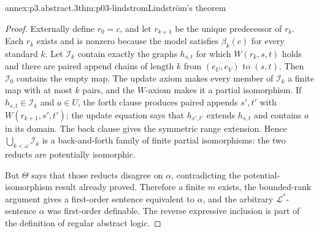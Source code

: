 \begin{annexitem}{annex:p3.abstract.3}{thm:p03-lindstrom}{Lindstr\"om's theorem}
\begin{proof}
Externally define \(r_0=c\), and let \(r_{k+1}\) be the unique predecessor of
\(r_k\).  Each \(r_k\) exists and is nonzero because the model satisfies
\(\beta_k(c)\) for every standard \(k\).  Let
\(\mathcal I_k\) contain exactly the graphs \(h_{s,t}\) for which
\(W(r_k,s,t)\) holds and there are paired append chains of length \(k\) from
\((e_U,e_V)\) to \((s,t)\).  Then \(\mathcal I_0\) contains the empty map.
The update axiom makes every member of \(\mathcal I_k\) a finite map with at
most \(k\) pairs, and the \(W\)-axiom makes it a partial isomorphism.  If
\(h_{s,t}\in\mathcal I_k\) and \(a\in U\), the forth clause produces paired
appends \(s',t'\) with \(W(r_{k+1},s',t')\); the update equation says that
\(h_{s',t'}\) extends \(h_{s,t}\) and contains \(a\) in its domain.  The back
clause gives the symmetric range extension.  Hence
\(\bigcup_{k<\omega}\mathcal I_k\) is a back-and-forth family of finite
partial isomorphisms: the two reducts are potentially isomorphic.

But \(\Theta\) says that those reducts disagree on \(\alpha\), contradicting
the potential-isomorphism result already proved.  Therefore a finite \(m\)
exists, the bounded-rank argument gives a first-order sentence equivalent to
\(\alpha\), and the arbitrary \(\mathcal L^*\)-sentence \(\alpha\) was
first-order definable.  The reverse expressive inclusion is part of the
definition of regular abstract logic.
\end{proof}
\end{annexitem}
